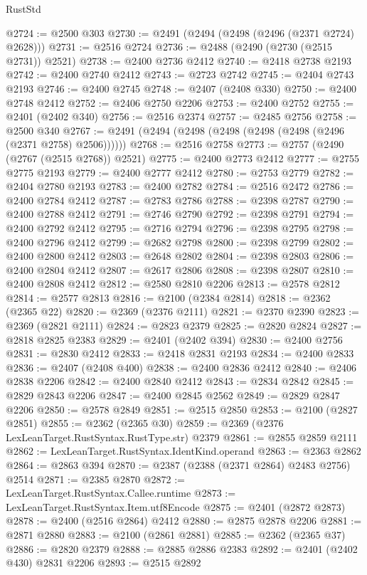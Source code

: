 \begin{lexlean}{RustStd}
\begin{coremodule}
@2724 := @2500 @303
@2730 := @2491 (@2494 (@2498 (@2496 (@2371 @2724) @2628)))
@2731 := @2516 @2724
@2736 := @2488 (@2490 (@2730 (@2515 @2731)) @2521)
@2738 := @2400 @2736 @2412
@2740 := @2418 @2738 @2193
@2742 := @2400 @2740 @2412
@2743 := @2723 @2742
@2745 := @2404 @2743 @2193
@2746 := @2400 @2745
@2748 := @2407 (@2408 @330)
@2750 := @2400 @2748 @2412
@2752 := @2406 @2750 @2206
@2753 := @2400 @2752
@2755 := @2401 (@2402 @340)
@2756 := @2516 @2374
@2757 := @2485 @2756
@2758 := @2500 @340
@2767 := @2491 (@2494 (@2498 (@2498 (@2498 (@2498 (@2496 (@2371 @2758) @2506))))))
@2768 := @2516 @2758
@2773 := @2757 (@2490 (@2767 (@2515 @2768)) @2521)
@2775 := @2400 @2773 @2412
@2777 := @2755 @2775 @2193
@2779 := @2400 @2777 @2412
@2780 := @2753 @2779
@2782 := @2404 @2780 @2193
@2783 := @2400 @2782
@2784 := @2516 @2472
@2786 := @2400 @2784 @2412
@2787 := @2783 @2786
@2788 := @2398 @2787
@2790 := @2400 @2788 @2412
@2791 := @2746 @2790
@2792 := @2398 @2791
@2794 := @2400 @2792 @2412
@2795 := @2716 @2794
@2796 := @2398 @2795
@2798 := @2400 @2796 @2412
@2799 := @2682 @2798
@2800 := @2398 @2799
@2802 := @2400 @2800 @2412
@2803 := @2648 @2802
@2804 := @2398 @2803
@2806 := @2400 @2804 @2412
@2807 := @2617 @2806
@2808 := @2398 @2807
@2810 := @2400 @2808 @2412
@2812 := @2580 @2810 @2206
@2813 := @2578 @2812
@2814 := @2577 @2813
@2816 := @2100 (@2384 @2814)
@2818 := @2362 (@2365 @22)
@2820 := @2369 (@2376 @2111)
@2821 := @2370 @2390
@2823 := @2369 (@2821 @2111)
@2824 := @2823 @2379
@2825 := @2820 @2824
@2827 := @2818 @2825 @2383
@2829 := @2401 (@2402 @394)
@2830 := @2400 @2756
@2831 := @2830 @2412
@2833 := @2418 @2831 @2193
@2834 := @2400 @2833
@2836 := @2407 (@2408 @400)
@2838 := @2400 @2836 @2412
@2840 := @2406 @2838 @2206
@2842 := @2400 @2840 @2412
@2843 := @2834 @2842
@2845 := @2829 @2843 @2206
@2847 := @2400 @2845 @2562
@2849 := @2829 @2847 @2206
@2850 := @2578 @2849
@2851 := @2515 @2850
@2853 := @2100 (@2827 @2851)
@2855 := @2362 (@2365 @30)
@2859 := @2369 (@2376 LexLeanTarget.RustSyntax.RustType.str) @2379
@2861 := @2855 @2859 @2111
@2862 := LexLeanTarget.RustSyntax.IdentKind.operand
@2863 := @2363 @2862
@2864 := @2863 @394
@2870 := @2387 (@2388 (@2371 @2864) @2483 @2756) @2514
@2871 := @2385 @2870
@2872 := LexLeanTarget.RustSyntax.Callee.runtime
@2873 := LexLeanTarget.RustSyntax.Item.utf8Encode
@2875 := @2401 (@2872 @2873)
@2878 := @2400 (@2516 @2864) @2412
@2880 := @2875 @2878 @2206
@2881 := @2871 @2880
@2883 := @2100 (@2861 @2881)
@2885 := @2362 (@2365 @37)
@2886 := @2820 @2379
@2888 := @2885 @2886 @2383
@2892 := @2401 (@2402 @430) @2831 @2206
@2893 := @2515 @2892

\end{coremodule}
\end{lexlean}
